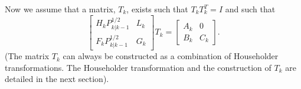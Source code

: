 	Now we assume that a matrix, $T_k$, exists
such that $T_kT_k^T=I$ and such that
%
\begin{equation}
  \left[\begin{array}{cc}H_kP_{k|k-1}^{1/2}&L_k\\
                         F_kP_{k|k-1}^{1/2}&G_k\end{array}\right]T_k
=
  \left[\begin{array}{cc}A_k&0\\
                         B_k&C_k\end{array}\right].
\label{e.kf45}
\end{equation}
%
(The matrix $T_k$ can always be constructed as a combination
of Householder transformations.  The Householder
transformation and the construction of $T_k$ are detailed
in the next section).

